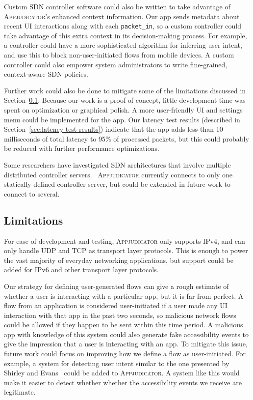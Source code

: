 Custom SDN controller software could also be written to take advantage of
\textsc{Appjudicator}'s enhanced context information. Our app sends metadata
about recent UI interactions along with each \texttt{packet\_in}, so a custom
controller could take advantage of this extra context in its decision-making
process. For example, a controller could have a more sophisticated algorithm for
inferring user intent, and use this to block non-user-initiated flows from
mobile devices. A custom controller could also empower system administrators to
write fine-grained, context-aware SDN policies. 

Further work could also be done to mitigate some of the limitations discussed in
Section~\ref{sec:limitations}. Because our work is a proof of concept, little
development time was spent on optimization or graphical polish. A more
user-friendly UI and settings menu could be implemented for the app. Our latency
test results (described in Section~\ref{sec:latency-test-results}) indicate that
the app adds less than 10 milliseconds of total latency to 95\% of processed
packets, but this could probably be reduced with further performance
optimizations.

Some researchers have investigated SDN architectures that involve multiple
distributed controller servers.~\cite{dixit2013, oktian2017}
\textsc{Appjudicator} currently connects to only one statically-defined
controller server, but could be extended in future work to connect to several.

\subsection{Limitations}
\label{sec:limitations}

For ease of development and testing, \textsc{Appjudicator} only supports IPv4,
and can only handle UDP and TCP as transport layer protocols. This is enough to
power the vast majority of everyday networking applications, but support could
be added for IPv6 and other transport layer protocols.

Our strategy for defining user-generated flows can give a rough estimate of
whether a user is interacting with a particular app, but it is far from perfect.
A flow from an application is considered user-initiated if a user made any UI
interaction with that app in the past two seconds, so malicious network flows
could be allowed if they happen to be sent within this time period. A malicious
app with knowledge of this system could also generate fake accessibility events
to give the impression that a user is interacting with an app. To mitigate this
issue, future work could focus on improving how we define a flow as
user-initiated. For example, a system for detecting user intent similar to the
one presented by Shirley and Evans~\cite{shirley2008} could be added to
\textsc{Appjudicator}. A system like this would make it easier to detect whether
whether the accessibility events we receive are legitimate.

